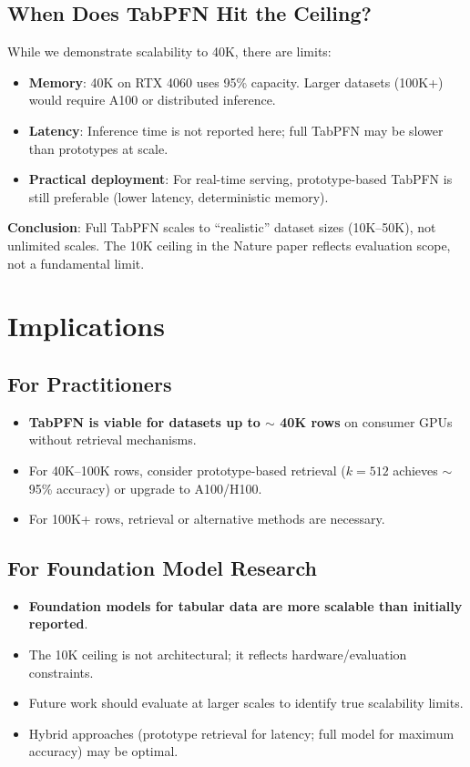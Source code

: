 \documentclass[11pt,a4paper]{article}
\begin{document}
\subsection{When Does TabPFN Hit the Ceiling?}

While we demonstrate scalability to 40K, there are limits:

\begin{itemize}
\item \textbf{Memory}: 40K on RTX 4060 uses 95\% capacity. Larger datasets (100K+) would require A100 or distributed inference.
\item \textbf{Latency}: Inference time is not reported here; full TabPFN may be slower than prototypes at scale.
\item \textbf{Practical deployment}: For real-time serving, prototype-based TabPFN is still preferable (lower latency, deterministic memory).
\end{itemize}

\textbf{Conclusion}: Full TabPFN scales to ``realistic'' dataset sizes (10K--50K), not unlimited scales. The 10K ceiling in the Nature paper reflects evaluation scope, not a fundamental limit.

\section{Implications}

\subsection{For Practitioners}

\begin{itemize}
\item \textbf{TabPFN is viable for datasets up to $\sim$ 40K rows} on consumer GPUs without retrieval mechanisms.
\item For 40K--100K rows, consider prototype-based retrieval ($k=512$ achieves $\sim$ 95\% accuracy) or upgrade to A100/H100.
\item For 100K+ rows, retrieval or alternative methods are necessary.
\end{itemize}

\subsection{For Foundation Model Research}

\begin{itemize}
\item \textbf{Foundation models for tabular data are more scalable than initially reported}.
\item The 10K ceiling is not architectural; it reflects hardware/evaluation constraints.
\item Future work should evaluate at larger scales to identify true scalability limits.
\item Hybrid approaches (prototype retrieval for latency; full model for maximum accuracy) may be optimal.
\end{itemize}
\end{document}
